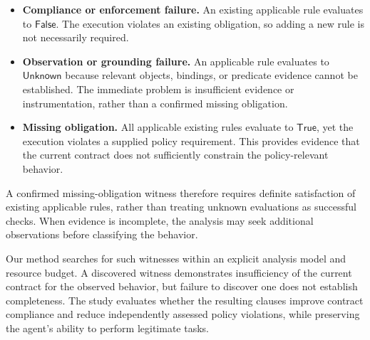 \begin{itemize}
    \item \textbf{Compliance or enforcement failure.}
    An existing applicable rule evaluates to
    $\mathsf{False}$. The execution violates an existing
    obligation, so adding a new rule is not necessarily required.

    \item \textbf{Observation or grounding failure.}
    An applicable rule evaluates to $\mathsf{Unknown}$
    because relevant objects, bindings, or predicate evidence
    cannot be established. The immediate problem is insufficient
    evidence or instrumentation, rather than a confirmed
    missing obligation.

    \item \textbf{Missing obligation.}
    All applicable existing rules evaluate to
    $\mathsf{True}$, yet the execution violates a supplied
    policy requirement. This provides evidence that the
    current contract does not sufficiently constrain the
    policy-relevant behavior.
\end{itemize}

A confirmed missing-obligation witness therefore requires
definite satisfaction of existing applicable rules, rather
than treating unknown evaluations as successful checks.
When evidence is incomplete, the analysis may seek additional
observations before classifying the behavior.

Our method searches for such witnesses within an explicit
analysis model and resource budget. A discovered witness
demonstrates insufficiency of the current contract for the
observed behavior, but failure to discover one does not
establish completeness. The study evaluates whether the
resulting clauses improve contract compliance and reduce
independently assessed policy violations, while preserving
the agent's ability to perform legitimate tasks. 